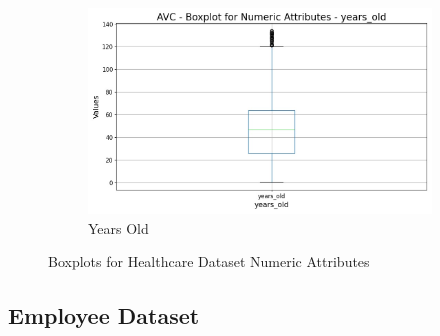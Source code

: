 \documentclass[a4paper,12pt]{article}
\begin{document}
\begin{figure}[h!]
    \begin{subfigure}[b]{0.45\textwidth}
        \centering
        \includegraphics[width=\textwidth]{Resources/Boxplot_years_old.jpeg}
        \caption{Years Old}
        \label{fig:years_old}
    \end{subfigure}
    
    \caption{Boxplots for Healthcare Dataset Numeric Attributes}
\end{figure}

\newpage
\subsection{Employee Dataset}
\end{document}
